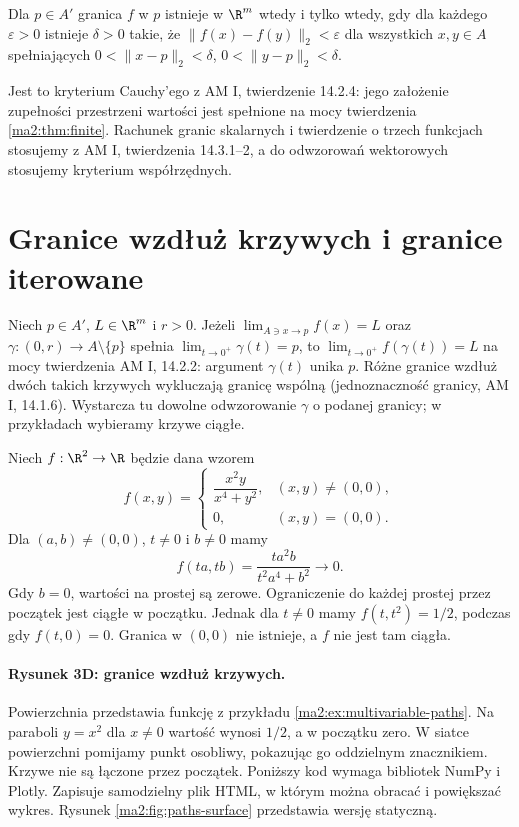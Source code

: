 \begin{wniosek}
\label{ma2:cor:multi-limit-cauchy}
Dla $p\in A'$ granica $f$ w $p$ istnieje w $\R^m$ wtedy
i tylko wtedy, gdy dla każdego $\varepsilon>0$ istnieje
$\delta>0$ takie, że $\|f(x)-f(y)\|_2<\varepsilon$
dla wszystkich $x,y\in A$ spełniających
$0<\|x-p\|_2<\delta$, $0<\|y-p\|_2<\delta$.
\end{wniosek}
Jest to kryterium Cauchy'ego z AM I, twierdzenie 14.2.4:
jego założenie zupełności przestrzeni wartości jest spełnione
na mocy twierdzenia \ref{ma2:thm:finite}.
Rachunek granic skalarnych i twierdzenie o trzech funkcjach
stosujemy z AM I, twierdzenia 14.3.1--2, a do odwzorowań
wektorowych stosujemy kryterium współrzędnych.

\section{Granice wzdłuż krzywych i granice iterowane}

Niech $p\in A'$, $L\in\R^m$ i $r>0$.
Jeżeli $\lim_{A\ni x\to p}f(x)=L$ oraz
$\gamma:(0,r)\to A\setminus\{p\}$ spełnia
$\lim_{t\to0^+}\gamma(t)=p$, to
$\lim_{t\to0^+}f(\gamma(t))=L$ na mocy twierdzenia
AM I, 14.2.2: argument $\gamma(t)$ unika $p$.
Różne granice wzdłuż dwóch takich krzywych wykluczają
granicę wspólną (jednoznaczność granicy, AM I, 14.1.6).
Wystarcza tu dowolne odwzorowanie $\gamma$ o podanej
granicy; w przykładach wybieramy krzywe ciągłe.

\begin{przyklad}
\label{ma2:ex:multivariable-paths}
Niech $f:\R^2\to\R$ będzie dana wzorem
\[
 f(x,y)=
 \begin{cases}
 \dfrac{x^2y}{x^4+y^2},&(x,y)\ne(0,0),\\
 0,&(x,y)=(0,0).
 \end{cases}
\]
Dla $(a,b)\ne(0,0)$, $t\ne0$ i $b\ne0$ mamy
\[
 f(ta,tb)=\frac{ta^2b}{t^2a^4+b^2}\longrightarrow0.
\]
Gdy $b=0$, wartości na prostej są zerowe.
Ograniczenie do każdej prostej przez początek jest
ciągłe w początku. Jednak dla $t\ne0$ mamy
$f(t,t^2)=1/2$, podczas gdy $f(t,0)=0$.
Granica w $(0,0)$ nie istnieje, a $f$ nie jest tam ciągła.
\end{przyklad}

\paragraph{Rysunek 3D: granice wzdłuż krzywych.}
Powierzchnia przedstawia funkcję z przykładu
\ref{ma2:ex:multivariable-paths}. Na paraboli $y=x^2$
dla $x\ne0$ wartość wynosi $1/2$, a w początku zero.
W siatce powierzchni pomijamy punkt osobliwy, pokazując go
oddzielnym znacznikiem. Krzywe nie są łączone przez początek.
Poniższy kod wymaga bibliotek NumPy i Plotly. Zapisuje samodzielny
plik HTML, w którym można obracać i powiększać wykres.
Rysunek \ref{ma2:fig:paths-surface} przedstawia wersję statyczną.

